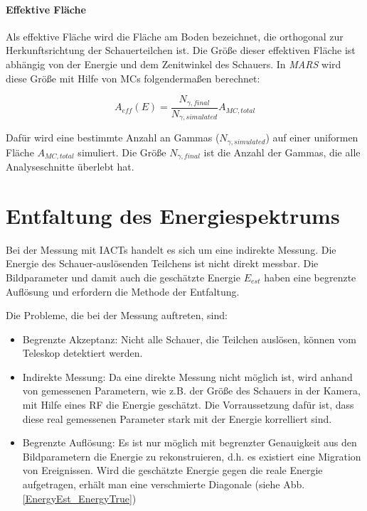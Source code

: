 \paragraph{Effektive Fläche}
Als effektive Fläche wird die Fläche am Boden bezeichnet, die orthogonal zur Herkunftsrichtung der Schauerteilchen ist.
Die Größe dieser effektiven Fläche ist abhängig von der Energie und dem Zenitwinkel des Schauers.
In \textit{MARS} wird diese Größe mit Hilfe von MCs folgendermaßen berechnet:

\begin{equation}
 A_{eff}(E)=\frac{N_{\gamma, final}}{N_{\gamma, simulated}}A_{MC, total}
\end{equation}

Dafür wird eine bestimmte Anzahl an Gammas ($N_{\gamma, simulated}$) auf einer uniformen Fläche $A_{MC,total}$ simuliert. 
Die Größe $N_{\gamma, final}$ ist die Anzahl der Gammas, die alle Analyseschnitte überlebt hat.


\section{Entfaltung des Energiespektrums}
\label{sec:Unfolding}
Bei der Messung mit IACTs handelt es sich um eine indirekte Messung.
Die Energie des Schauer-auslösenden Teilchens ist nicht direkt messbar.
Die Bildparameter und damit auch die geschätzte Energie $E_{est}$ haben eine begrenzte Auflösung und erfordern die Methode der Entfaltung.

Die Probleme, die bei der Messung auftreten, sind:

\begin{itemize}
 \item Begrenzte Akzeptanz: Nicht alle Schauer, die Teilchen auslösen, können vom Teleskop detektiert werden.
 \item Indirekte Messung: Da eine direkte Messung nicht möglich ist, wird anhand von gemessenen Parametern, wie z.B. der Größe des Schauers in der Kamera, mit Hilfe eines RF die Energie geschätzt.
       Die Vorraussetzung dafür ist, dass diese real gemessenen Parameter stark mit der Energie korrelliert sind.
 \item Begrenzte Auflösung: Es ist nur möglich mit begrenzter Genauigkeit aus den Bildparametern die Energie zu rekonstruieren, d.h. es existiert eine Migration von Ereignissen.
       Wird die geschätzte Energie gegen die reale Energie aufgetragen, erhält man eine verschmierte Diagonale (siehe Abb.\ref{EnergyEst_EnergyTrue})
\end{itemize}

